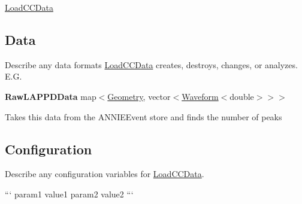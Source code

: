 \hyperlink{classLoadCCData}{Load\-C\-C\-Data}

\subsection*{Data}

Describe any data formats \hyperlink{classLoadCCData}{Load\-C\-C\-Data} creates, destroys, changes, or analyzes. E.\-G.

{\bfseries Raw\-L\-A\-P\-P\-D\-Data} {\ttfamily map$<$\hyperlink{classGeometry}{Geometry}, vector$<$\hyperlink{classWaveform}{Waveform}$<$double$>$$>$$>$}
\begin{DoxyItemize}
\item Takes this data from the {\ttfamily A\-N\-N\-I\-E\-Event} store and finds the number of peaks
\end{DoxyItemize}

\subsection*{Configuration}

Describe any configuration variables for \hyperlink{classLoadCCData}{Load\-C\-C\-Data}.

``` param1 value1 param2 value2 ``` 